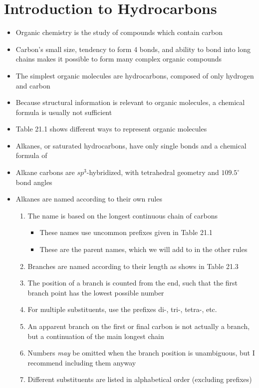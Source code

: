 \documentclass[12pt, openany, letterpaper]{memoir}
\begin{document}
\section{Introduction to Hydrocarbons}
\begin{itemize}
	\item Organic chemistry is the study of compounds which contain carbon
	\item Carbon's small size, tendency to form 4 bonds, and ability to bond into long chains makes it possible to form many complex organic compounds
	\item The simplest organic molecules are hydrocarbons, composed of only hydrogen and carbon
	\item Because structural information is relevant to organic molecules, a chemical formula is usually not sufficient
	\item Table 21.1 shows different ways to represent organic molecules
	\item Alkanes, or saturated hydrocarbons, have only single bonds and a chemical formula of 
	\item Alkane carbons are $sp^3$-hybridized, with tetrahedral geometry and $109.5^\circ$ bond angles
	\item Alkanes are named according to their own rules
	\begin{enumerate}
		\item The name is based on the longest continuous chain of carbons
		\begin{itemize}
			\item These names use uncommon prefixes given in Table 21.1
			\item These are the parent names, which we will add to in the other rules
		\end{itemize}
		\item Branches are named according to their length as shows in Table 21.3
		\item The position of a branch is counted from the end, such that the first branch point has the lowest possible number
		\item For multiple substituents, use the prefixes di-, tri-, tetra-, etc.
		\item An apparent branch on the first or final carbon is not actually a branch, but a continuation of the main longest chain
		\item Numbers \emph{may} be omitted when the branch position is unambiguous, but I recommend including them anyway
		\item Different substituents are listed in alphabetical order (excluding prefixes)

\end{enumerate}
\end{itemize}
\end{document}
